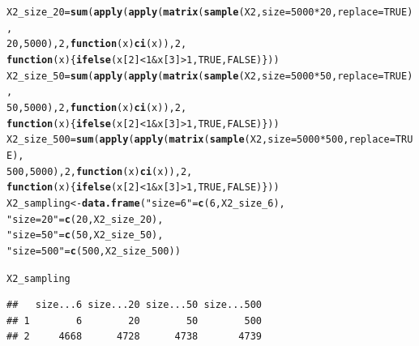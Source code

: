 \documentclass{article}\usepackage[]{graphicx}\usepackage[]{color}
\makeatletter
\newcommand{\hlnum}[1]{\textcolor[rgb]{0.686,0.059,0.569}{#1}}%
\newcommand{\hlstr}[1]{\textcolor[rgb]{0.192,0.494,0.8}{#1}}%
\newcommand{\hlopt}[1]{\textcolor[rgb]{0,0,0}{#1}}%
\newcommand{\hlstd}[1]{\textcolor[rgb]{0.345,0.345,0.345}{#1}}%
\newcommand{\hlkwa}[1]{\textcolor[rgb]{0.161,0.373,0.58}{\textbf{#1}}}%
\newcommand{\hlkwb}[1]{\textcolor[rgb]{0.69,0.353,0.396}{#1}}%
\newcommand{\hlkwc}[1]{\textcolor[rgb]{0.333,0.667,0.333}{#1}}%
\newcommand{\hlkwd}[1]{\textcolor[rgb]{0.737,0.353,0.396}{\textbf{#1}}}%
\newenvironment{kframe}{%
 \def\at@end@of@kframe{}%
 \ifinner\ifhmode%
  \def\at@end@of@kframe{\end{minipage}}%
  \begin{minipage}{\columnwidth}%
 \fi\fi%
 \def\FrameCommand##1{\hskip\@totalleftmargin \hskip-\fboxsep
 \colorbox{shadecolor}{##1}\hskip-\fboxsep
     \hskip-\linewidth \hskip-\@totalleftmargin \hskip\columnwidth}%
 \MakeFramed {\advance\hsize-\width
   \@totalleftmargin\z@ \linewidth\hsize
   \@setminipage}}%
 {\par\unskip\endMakeFramed%
 \at@end@of@kframe}
\newenvironment{knitrout}{}{} %
\makeatother
\begin{document}
\begin{knitrout}
\begin{kframe}
\begin{alltt}
\hlstd{X2_size_20} \hlkwb{=} \hlkwd{sum}\hlstd{(}\hlkwd{apply}\hlstd{(}\hlkwd{apply}\hlstd{(}\hlkwd{matrix}\hlstd{(}\hlkwd{sample}\hlstd{(X2,} \hlkwc{size} \hlstd{=} \hlnum{5000} \hlopt{*}\hlnum{20}\hlstd{,} \hlkwc{replace} \hlstd{=} \hlnum{TRUE}\hlstd{),}
                                   \hlnum{20}\hlstd{,}\hlnum{5000}\hlstd{),} \hlnum{2}\hlstd{,} \hlkwa{function}\hlstd{(}\hlkwc{x}\hlstd{)} \hlkwd{ci}\hlstd{(x)),} \hlnum{2}\hlstd{,}
                      \hlkwa{function}\hlstd{(}\hlkwc{x}\hlstd{)\{}\hlkwd{ifelse}\hlstd{(x[}\hlnum{2}\hlstd{]} \hlopt{<} \hlnum{1} \hlopt{&} \hlstd{x[}\hlnum{3}\hlstd{]} \hlopt{>} \hlnum{1}\hlstd{,} \hlnum{TRUE}\hlstd{,} \hlnum{FALSE}\hlstd{)\}))}
\hlstd{X2_size_50} \hlkwb{=} \hlkwd{sum}\hlstd{(}\hlkwd{apply}\hlstd{(}\hlkwd{apply}\hlstd{(}\hlkwd{matrix}\hlstd{(}\hlkwd{sample}\hlstd{(X2,} \hlkwc{size} \hlstd{=} \hlnum{5000} \hlopt{*}\hlnum{50}\hlstd{,} \hlkwc{replace} \hlstd{=} \hlnum{TRUE}\hlstd{),}
                                   \hlnum{50}\hlstd{,}\hlnum{5000}\hlstd{),} \hlnum{2}\hlstd{,} \hlkwa{function}\hlstd{(}\hlkwc{x}\hlstd{)} \hlkwd{ci}\hlstd{(x)),} \hlnum{2}\hlstd{,}
                      \hlkwa{function}\hlstd{(}\hlkwc{x}\hlstd{)\{}\hlkwd{ifelse}\hlstd{(x[}\hlnum{2}\hlstd{]} \hlopt{<} \hlnum{1} \hlopt{&} \hlstd{x[}\hlnum{3}\hlstd{]} \hlopt{>} \hlnum{1}\hlstd{,} \hlnum{TRUE}\hlstd{,} \hlnum{FALSE}\hlstd{)\}))}
\hlstd{X2_size_500} \hlkwb{=} \hlkwd{sum}\hlstd{(}\hlkwd{apply}\hlstd{(}\hlkwd{apply}\hlstd{(}\hlkwd{matrix}\hlstd{(}\hlkwd{sample}\hlstd{(X2,} \hlkwc{size} \hlstd{=} \hlnum{5000} \hlopt{*}\hlnum{500}\hlstd{,} \hlkwc{replace} \hlstd{=} \hlnum{TRUE}\hlstd{),}
                                   \hlnum{500}\hlstd{,}\hlnum{5000}\hlstd{),} \hlnum{2}\hlstd{,} \hlkwa{function}\hlstd{(}\hlkwc{x}\hlstd{)} \hlkwd{ci}\hlstd{(x)),} \hlnum{2}\hlstd{,}
                      \hlkwa{function}\hlstd{(}\hlkwc{x}\hlstd{)\{}\hlkwd{ifelse}\hlstd{(x[}\hlnum{2}\hlstd{]} \hlopt{<} \hlnum{1} \hlopt{&} \hlstd{x[}\hlnum{3}\hlstd{]} \hlopt{>} \hlnum{1}\hlstd{,} \hlnum{TRUE}\hlstd{,} \hlnum{FALSE}\hlstd{)\}))}
\hlstd{X2_sampling} \hlkwb{<-} \hlkwd{data.frame}\hlstd{(}\hlstr{"size = 6"} \hlstd{=} \hlkwd{c}\hlstd{(}\hlnum{6}\hlstd{, X2_size_6),}
                          \hlstr{"size = 20"} \hlstd{=} \hlkwd{c}\hlstd{(}\hlnum{20}\hlstd{, X2_size_20),}
                          \hlstr{"size = 50"} \hlstd{=} \hlkwd{c}\hlstd{(}\hlnum{50}\hlstd{, X2_size_50),}
                          \hlstr{"size = 500"} \hlstd{=} \hlkwd{c}\hlstd{(}\hlnum{500}\hlstd{, X2_size_500))}

\hlstd{X2_sampling}
\end{alltt}
\begin{verbatim}
##   size...6 size...20 size...50 size...500
## 1        6        20        50        500
## 2     4668      4728      4738       4739
\end{verbatim}
\end{kframe}
\end{knitrout}
\end{document}
